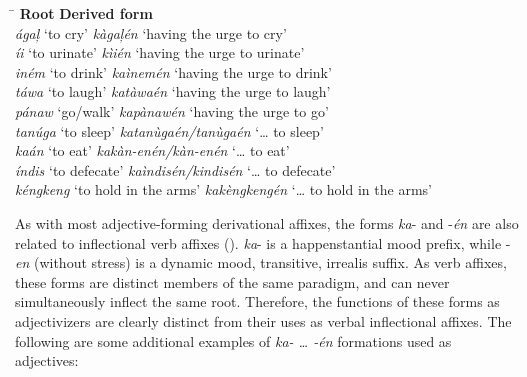 \ea
\begin{tabbing}
\hspace{5cm} \= \kill
\textbf{Root}    \>  \textbf{Derived form} \\
\textit{ágaļ} ‘to cry’ \> \textit{kàgaļén} ‘having the urge to cry’ \\
\textit{íi} ‘to urinate’ \> \textit{kìién  } ‘having the urge to urinate’ \\
\textit{iném} ‘to drink’ \> \textit{kaìnemén} ‘having the urge to drink’ \\
\textit{táwa} ‘to laugh’ \> \textit{katàwaén} ‘having the urge to laugh’ \\
\textit{pánaw} ‘go/walk’ \> \textit{kapànawén} ‘having the urge to go’ \\
\textit{tanúga} ‘to sleep’ \> \textit{katanùgaén/tanùgaén} ‘… to sleep’ \\
\textit{kaán} ‘to eat’ \> \textit{kakàn-enén/kàn-enén} ‘… to eat’ \\
\textit{índis} ‘to defecate’ \> \textit{kaìndisén/kindisén } ‘… to defecate’ \\
\textit{kéngkeng} ‘to hold in the arms’ \>  \textit{kakèngkengén} ‘… to hold in the arms’
\end{tabbing}
\z

As with most adjective-forming derivational affixes, the forms \textit{ka}{}- and -\textit{én} are also related to inflectional verb affixes (). \textit{ka}{}- is a happenstantial mood prefix, while \nobreakdash-\textit{en} (without stress) is a dynamic mood, transitive, irrealis suffix. As verb affixes, these forms are distinct members of the same paradigm, and can never simultaneously inflect the same root. Therefore, the functions of these forms as adjectivizers are clearly distinct from their uses as verbal inflectional affixes. The following are some additional examples of \textit{ka- … -én} formations used as adjectives:

